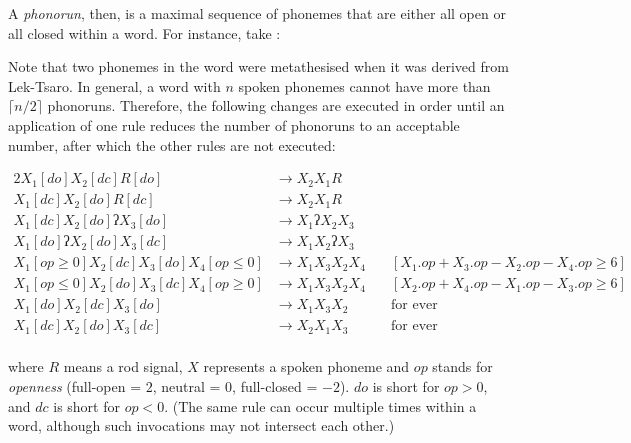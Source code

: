 \documentclass{book}
\begin{document}
A \emph{phonorun}, then, is a maximal sequence of phonemes that are either all open or all closed within a word. For instance, take :

\begin{center}
\end{center}

Note that two phonemes in the word were metathesised when it was derived from Lek-Tsaro. In general, a word with $n$ spoken phonemes cannot have more than $\lceil n/2 \rceil$ phonoruns. Therefore, the following changes are executed in order until an application of one rule reduces the number of phonoruns to an acceptable number, after which the other rules are not executed:

\begin{alignat*}{2}
  X_1[do] X_2[dc] R[do] &\rightarrow X_2 X_1 R \\
  X_1[dc] X_2[do] R[dc] &\rightarrow X_2 X_1 R \\
  X_1[dc] X_2[do] \text{ʔ} X_3[do] &\rightarrow X_1 \text{ʔ} X_2 X_3 \\
  X_1[do] \text{ʔ} X_2[do] X_3[dc] &\rightarrow X_1 X_2 \text{ʔ} X_3 \\
  X_1[op \ge 0] X_2[dc] X_3[do] X_4[op \le 0] &\rightarrow X_1 X_3 X_2 X_4 &\quad[X_1.op + X_3.op - X_2.op - X_4.op \ge 6] \\
  X_1[op \le 0] X_2[do] X_3[dc] X_4[op \ge 0] &\rightarrow X_1 X_3 X_2 X_4 &\quad[X_2.op + X_4.op - X_1.op - X_3.op \ge 6] \\
  X_1[do] X_2[dc] X_3[do] &\rightarrow X_1 X_3 X_2 &\quad\text{for ever} \\
  X_1[dc] X_2[do] X_3[dc] &\rightarrow X_2 X_1 X_3 &\quad\text{for ever} \\
\end{alignat*}

where $R$ means a rod signal, $X$ represents a spoken phoneme and $op$ stands for \emph{openness} (full-open = $2$, neutral = $0$, full-closed = $-2$). $do$ is short for $op > 0$, and $dc$ is short for $op < 0$. (The same rule can occur multiple times within a word, although such invocations may not intersect each other.)
\end{document}
